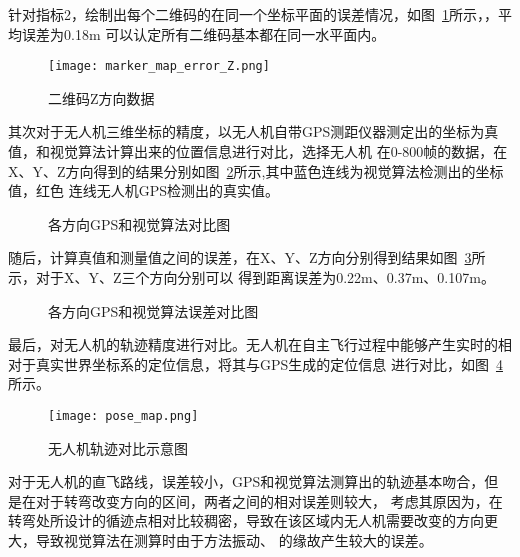 针对指标2，绘制出每个二维码的在同一个坐标平面的误差情况，如图~\ref{fig:marker_map_error_Z}所示，，平均误差为0.18m
可以认定所有二维码基本都在同一水平面内。
    \begin{figure}[H] %
      \centering
      \texttt{[image: marker\_map\_error\_Z.png]}
      \caption{二维码Z方向数据}
      \label{fig:marker_map_error_Z}
    \end{figure}
其次对于无人机三维坐标的精度，以无人机自带GPS测距仪器测定出的坐标为真值，和视觉算法计算出来的位置信息进行对比，选择无人机
在0-800帧的数据，在X、Y、Z方向得到的结果分别如图~\ref{fig:chap2:pose_xyz}所示,其中蓝色连线为视觉算法检测出的坐标值，红色
连线无人机GPS检测出的真实值。
\begin{figure}[htbp]
  \centering
  \vskip0.5cm
  \caption{各方向GPS和视觉算法对比图}\label{fig:chap2:pose_xyz}
  \end{figure}
随后，计算真值和测量值之间的误差，在X、Y、Z方向分别得到结果如图~\ref{fig:chap2:pose_error_xyz}所示，对于X、Y、Z三个方向分别可以
得到距离误差为0.22m、0.37m、0.107m。
  \begin{figure}[H]
    \centering
    \vskip0.5cm
    \vskip0.5cm
    \caption{各方向GPS和视觉算法误差对比图}\label{fig:chap2:pose_error_xyz}
    \end{figure}
最后，对无人机的轨迹精度进行对比。无人机在自主飞行过程中能够产生实时的相对于真实世界坐标系的定位信息，将其与GPS生成的定位信息
进行对比，如图~\ref{fig:pose_map}所示。
    \begin{figure}[H] %
      \centering
      \texttt{[image: pose\_map.png]}
      \caption{无人机轨迹对比示意图}
      \label{fig:pose_map}
    \end{figure}
    对于无人机的直飞路线，误差较小，GPS和视觉算法测算出的轨迹基本吻合，但是在对于转弯改变方向的区间，两者之间的相对误差则较大，
    考虑其原因为，在转弯处所设计的循迹点相对比较稠密，导致在该区域内无人机需要改变的方向更大，导致视觉算法在测算时由于方法振动、
    的缘故产生较大的误差。